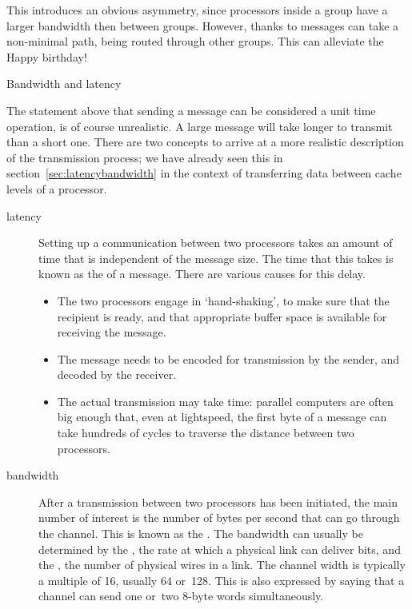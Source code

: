 This introduces an obvious asymmetry, since processors inside a group
have a larger bandwidth then between groups. However, thanks to
 messages can take a non-minimal path,
being routed through other groups. This can alleviate the Happy birthday!

 {Bandwidth and latency}
\label{sec:bwlatency}

The statement above that sending a message can be considered a unit
time operation, is of course unrealistic. A large message will take
longer to transmit than a short one. There are two concepts to arrive
at a more realistic description of the transmission process; we have
already seen this in section~\ref{sec:latencybandwidth} in the context
of transferring data between cache levels of a processor.
\begin{description}
\item[latency] Setting up a communication between two processors takes
  an amount of time that is independent of the message size. The time
  that this takes is known as the  of a message.
  There are various causes for this delay.
  \begin{itemize}
  \item The two processors engage in `hand-shaking', to make sure that
    the recipient is ready, and that appropriate buffer space is
    available for receiving the message.
  \item The message needs to be encoded for transmission by the sender,
    and decoded by the receiver.
  \item The actual transmission may take time: parallel computers are
    often big enough that, even at lightspeed, the first byte of a
    message can take hundreds of cycles to traverse the distance
    between two processors.
  \end{itemize}
\item[bandwidth] After a transmission between two processors has been
  initiated, the main number of interest is the number of bytes per
  second that can go through the channel. This is known as the
  . The bandwidth can usually be determined by
  the , the rate at which a physical link can
  deliver bits, and the , the number of
  physical wires in a link. The channel width is typically a multiple
  of 16, usually 64 or~128. This is also expressed by saying that a
  channel can send one or~two 8-byte words simultaneously.
\end{description}

